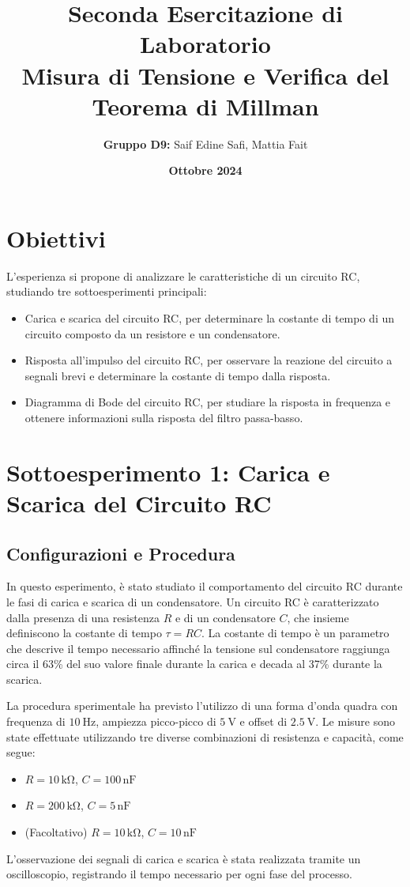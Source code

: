 \documentclass[a4paper,10pt]{article}
\title{\Large\textbf{Seconda Esercitazione di Laboratorio}\\ \vspace{0.5em} \large Misura di Tensione e Verifica del Teorema di Millman}
\author{\textbf{Gruppo D9:} Saif Edine Safi, Mattia Fait}
\date{\textbf{Ottobre 2024}}
\begin{document}
\maketitle
\tableofcontents %
\newpage

\section{Obiettivi}
L'esperienza si propone di analizzare le caratteristiche di un circuito RC, studiando tre sottoesperimenti principali:
\begin{itemize}
    \item Carica e scarica del circuito RC, per determinare la costante di tempo di un circuito composto da un resistore e un condensatore.
    \item Risposta all'impulso del circuito RC, per osservare la reazione del circuito a segnali brevi e determinare la costante di tempo dalla risposta.
    \item Diagramma di Bode del circuito RC, per studiare la risposta in frequenza e ottenere informazioni sulla risposta del filtro passa-basso.
\end{itemize}


\section{Sottoesperimento 1: Carica e Scarica del Circuito RC}
\subsection{Configurazioni e Procedura}
In questo esperimento, è stato studiato il comportamento del circuito RC durante le fasi di carica e scarica di un condensatore. Un circuito RC è caratterizzato dalla presenza di una resistenza \( R \) e di un condensatore \( C \), che insieme definiscono la costante di tempo \(\tau = RC\). La costante di tempo è un parametro che descrive il tempo necessario affinché la tensione sul condensatore raggiunga circa il 63\% del suo valore finale durante la carica e decada al 37\% durante la scarica.

La procedura sperimentale ha previsto l'utilizzo di una forma d'onda quadra con frequenza di \(\SI{10}{\hertz}\), ampiezza picco-picco di \(\SI{5}{\volt}\) e offset di \(\SI{2.5}{\volt}\). Le misure sono state effettuate utilizzando tre diverse combinazioni di resistenza e capacità, come segue:
\begin{itemize}
    \item \( R = 10 \, \mathrm{k\Omega} \), \( C = 100 \, \mathrm{nF} \)
    \item \( R = 200 \, \mathrm{k\Omega} \), \( C = 5 \, \mathrm{nF} \)
    \item (Facoltativo) \( R = 10 \, \mathrm{k\Omega} \), \( C = 10 \, \mathrm{nF} \)
\end{itemize}
L'osservazione dei segnali di carica e scarica è stata realizzata tramite un oscilloscopio, registrando il tempo necessario per ogni fase del processo.
\end{document}
